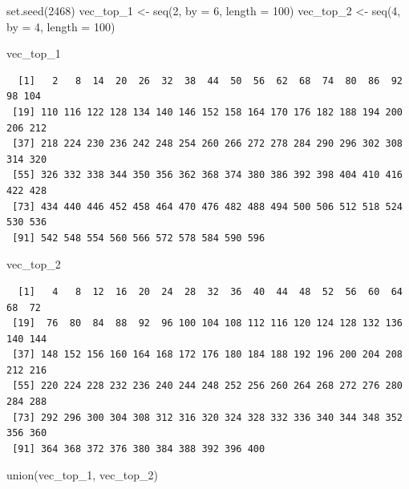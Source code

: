 \documentclass[
  letterpaper,
  DIV=11,
  numbers=noendperiod]{scrreprt}
\newenvironment{Shaded}{\begin{snugshade}}{\end{snugshade}}
\newcommand{\AttributeTok}[1]{\textcolor[rgb]{0.40,0.45,0.13}{#1}}
\newcommand{\DecValTok}[1]{\textcolor[rgb]{0.68,0.00,0.00}{#1}}
\newcommand{\FunctionTok}[1]{\textcolor[rgb]{0.28,0.35,0.67}{#1}}
\newcommand{\NormalTok}[1]{\textcolor[rgb]{0.00,0.23,0.31}{#1}}
\newcommand{\OtherTok}[1]{\textcolor[rgb]{0.00,0.23,0.31}{#1}}
\begin{document}
\begin{Shaded}
\begin{Highlighting}[]
\FunctionTok{set.seed}\NormalTok{(}\DecValTok{2468}\NormalTok{)}
\NormalTok{vec\_top\_1 }\OtherTok{\textless{}{-}} \FunctionTok{seq}\NormalTok{(}\DecValTok{2}\NormalTok{, }\AttributeTok{by =} \DecValTok{6}\NormalTok{, }\AttributeTok{length =} \DecValTok{100}\NormalTok{)}
\NormalTok{vec\_top\_2 }\OtherTok{\textless{}{-}} \FunctionTok{seq}\NormalTok{(}\DecValTok{4}\NormalTok{, }\AttributeTok{by =} \DecValTok{4}\NormalTok{, }\AttributeTok{length =} \DecValTok{100}\NormalTok{)}
\end{Highlighting}
\end{Shaded}

\begin{Shaded}
\begin{Highlighting}[]
\NormalTok{vec\_top\_1 }
\end{Highlighting}
\end{Shaded}

\begin{verbatim}
  [1]   2   8  14  20  26  32  38  44  50  56  62  68  74  80  86  92  98 104
 [19] 110 116 122 128 134 140 146 152 158 164 170 176 182 188 194 200 206 212
 [37] 218 224 230 236 242 248 254 260 266 272 278 284 290 296 302 308 314 320
 [55] 326 332 338 344 350 356 362 368 374 380 386 392 398 404 410 416 422 428
 [73] 434 440 446 452 458 464 470 476 482 488 494 500 506 512 518 524 530 536
 [91] 542 548 554 560 566 572 578 584 590 596
\end{verbatim}

\begin{Shaded}
\begin{Highlighting}[]
\NormalTok{vec\_top\_2}
\end{Highlighting}
\end{Shaded}

\begin{verbatim}
  [1]   4   8  12  16  20  24  28  32  36  40  44  48  52  56  60  64  68  72
 [19]  76  80  84  88  92  96 100 104 108 112 116 120 124 128 132 136 140 144
 [37] 148 152 156 160 164 168 172 176 180 184 188 192 196 200 204 208 212 216
 [55] 220 224 228 232 236 240 244 248 252 256 260 264 268 272 276 280 284 288
 [73] 292 296 300 304 308 312 316 320 324 328 332 336 340 344 348 352 356 360
 [91] 364 368 372 376 380 384 388 392 396 400
\end{verbatim}

\begin{Shaded}
\begin{Highlighting}[]
\FunctionTok{union}\NormalTok{(vec\_top\_1, vec\_top\_2)}
\end{Highlighting}
\end{Shaded}
\end{document}
